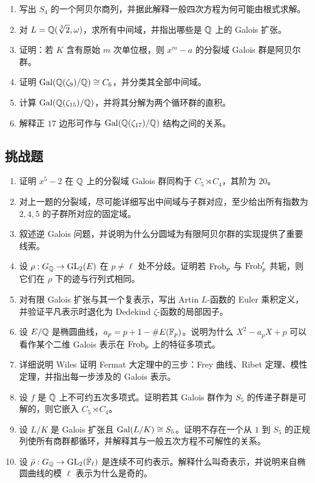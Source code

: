 \begin{enumerate}[resume, label=\textbf{习题12.\arabic*.}, leftmargin=*, itemsep=0.75em]
\item \medium 写出 $S_4$ 的一个阿贝尔商列，并据此解释一般四次方程为何可能由根式求解。
\item \medium 对 $L=\mathbb{Q}(\sqrt[3]{2},\omega)$，求所有中间域，并指出哪些是 $\mathbb{Q}$ 上的 Galois 扩张。
\item \medium 证明：若 $K$ 含有原始 $m$ 次单位根，则 $x^m-a$ 的分裂域 Galois 群是阿贝尔群。
\item \medium 证明 $\mathrm{Gal}(\mathbb{Q}(\zeta_9)/\mathbb{Q})\cong C_6$，并分类其全部中间域。
\item \medium 计算 $\mathrm{Gal}(\mathbb{Q}(\zeta_{15})/\mathbb{Q})$，并将其分解为两个循环群的直积。
\item \medium 解释正 $17$ 边形可作与 $\mathrm{Gal}(\mathbb{Q}(\zeta_{17})/\mathbb{Q})$ 结构之间的关系。
\end{enumerate}

\subsection*{挑战题}

\begin{enumerate}[resume, label=\textbf{习题12.\arabic*.}, leftmargin=*, itemsep=0.75em]
\item \hard 证明 $x^5-2$ 在 $\mathbb{Q}$ 上的分裂域 Galois 群同构于 $C_5\rtimes C_4$，其阶为 $20$。
\item \hard 对上一题的分裂域，尽可能详细写出中间域与子群对应，至少给出所有指数为 $2,4,5$ 的子群所对应的固定域。
\item \hard 叙述逆 Galois 问题，并说明为什么分圆域为有限阿贝尔群的实现提供了重要线索。
\item \hard 设 $\rho:G_{\mathbb{Q}}\to\mathrm{GL}_2(E)$ 在 $p\neq\ell$ 处不分歧。证明若 $\mathrm{Frob}_p$ 与 $\mathrm{Frob}_p'$ 共轭，则它们在 $\rho$ 下的迹与行列式相同。
\item \hard 对有限 Galois 扩张与其一个复表示，写出 Artin $L$-函数的 Euler 乘积定义，并验证平凡表示时退化为 Dedekind $\zeta$-函数的局部因子。
\item \hard 设 $E/\mathbb{Q}$ 是椭圆曲线，$a_p=p+1-\#E(\mathbb{F}_p)$。说明为什么 $X^2-a_pX+p$ 可以看作某个二维 Galois 表示在 $\mathrm{Frob}_p$ 上的特征多项式。
\item \hard 详细说明 Wiles 证明 Fermat 大定理中的三步：Frey 曲线、Ribet 定理、模性定理，并指出每一步涉及的 Galois 表示。
\item \hard 设 $f$ 是 $\mathbb{Q}$ 上不可约五次多项式。证明若其 Galois 群作为 $S_5$ 的传递子群是可解的，则它嵌入 $C_5\rtimes C_4$。
\item \hard 设 $L/K$ 是 Galois 扩张且 $\mathrm{Gal}(L/K)\cong S_5$。证明不存在一个从 $1$ 到 $S_5$ 的正规列使所有商群都循环，并解释其与一般五次方程不可解性的关系。
\item \hard 设 $\bar\rho:G_{\mathbb{Q}}\to\mathrm{GL}_2(\bar{\mathbb{F}}_{\ell})$ 是连续不可约表示。解释什么叫奇表示，并说明来自椭圆曲线的模 $\ell$ 表示为什么是奇的。
\end{enumerate}

